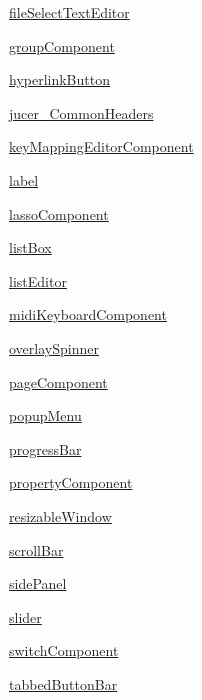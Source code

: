 \begin{DoxyCompactItemize}
\item 
 \mbox{\hyperlink{namespaceColourIds_1_1fileSelectTextEditor}{file\+Select\+Text\+Editor}}
\item 
 \mbox{\hyperlink{namespaceColourIds_1_1groupComponent}{group\+Component}}
\item 
 \mbox{\hyperlink{namespaceColourIds_1_1hyperlinkButton}{hyperlink\+Button}}
\item 
 \mbox{\hyperlink{namespaceColourIds_1_1jucer__CommonHeaders}{jucer\+\_\+\+Common\+Headers}}
\item 
 \mbox{\hyperlink{namespaceColourIds_1_1keyMappingEditorComponent}{key\+Mapping\+Editor\+Component}}
\item 
 \mbox{\hyperlink{namespaceColourIds_1_1label}{label}}
\item 
 \mbox{\hyperlink{namespaceColourIds_1_1lassoComponent}{lasso\+Component}}
\item 
 \mbox{\hyperlink{namespaceColourIds_1_1listBox}{list\+Box}}
\item 
 \mbox{\hyperlink{namespaceColourIds_1_1listEditor}{list\+Editor}}
\item 
 \mbox{\hyperlink{namespaceColourIds_1_1midiKeyboardComponent}{midi\+Keyboard\+Component}}
\item 
 \mbox{\hyperlink{namespaceColourIds_1_1overlaySpinner}{overlay\+Spinner}}
\item 
 \mbox{\hyperlink{namespaceColourIds_1_1pageComponent}{page\+Component}}
\item 
 \mbox{\hyperlink{namespaceColourIds_1_1popupMenu}{popup\+Menu}}
\item 
 \mbox{\hyperlink{namespaceColourIds_1_1progressBar}{progress\+Bar}}
\item 
 \mbox{\hyperlink{namespaceColourIds_1_1propertyComponent}{property\+Component}}
\item 
 \mbox{\hyperlink{namespaceColourIds_1_1resizableWindow}{resizable\+Window}}
\item 
 \mbox{\hyperlink{namespaceColourIds_1_1scrollBar}{scroll\+Bar}}
\item 
 \mbox{\hyperlink{namespaceColourIds_1_1sidePanel}{side\+Panel}}
\item 
 \mbox{\hyperlink{namespaceColourIds_1_1slider}{slider}}
\item 
 \mbox{\hyperlink{namespaceColourIds_1_1switchComponent}{switch\+Component}}
\item 
 \mbox{\hyperlink{namespaceColourIds_1_1tabbedButtonBar}{tabbed\+Button\+Bar}}
\item 

\end{DoxyCompactItemize}
